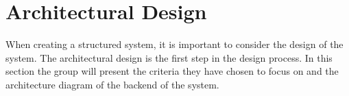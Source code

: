 \section{Architectural Design}\label{sec:architectural-design}

When creating a structured system, it is important to consider the design of the system.
The architectural design is the first step in the design process.
In this section the group will present the criteria they have chosen to focus on and the architecture diagram of the
backend of the system.



